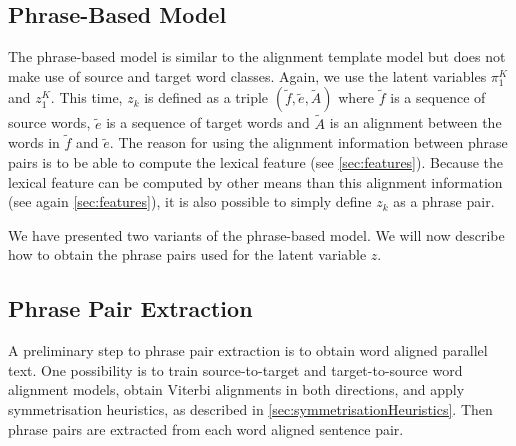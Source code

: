 \subsection{Phrase-Based Model}

The phrase-based model is similar to the alignment template
model but does not make use of source and target word classes.
Again, we use the latent variables $\pi_1^K$ and $z_1^K$.
This time, $z_k$ is defined as a triple $(\tilde{f}, \tilde{e}, \tilde{A})$
where $\tilde{f}$ is a sequence of source words, $\tilde{e}$ is a sequence
of target words and $\tilde{A}$ is an alignment between the words in $\tilde{f}$ and $\tilde{e}$.
The reason for using the alignment information between phrase pairs is to be able
to compute the lexical feature (see \autoref{sec:features}).
Because the lexical feature can be computed
by other means than this alignment
information (see again \autoref{sec:features}), it is also possible to simply
define $z_k$ as a phrase pair.

We have presented two variants of the phrase-based model. We will now
describe how to obtain the phrase pairs used for the latent variable $z$.

\subsection{Phrase Pair Extraction}
\label{sec:phrasextract}

A preliminary step to phrase pair extraction
is to obtain word aligned parallel text.
One possibility is to train source-to-target and
target-to-source word alignment models, obtain
Viterbi alignments in both directions, and
apply symmetrisation heuristics, as described
in \autoref{sec:symmetrisationHeuristics}.
Then phrase pairs are extracted from each
word aligned sentence pair.

